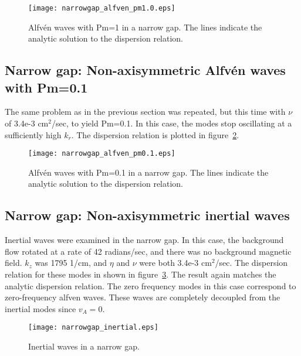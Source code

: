 \documentclass[letterpaper]{article}
\begin{document}
\begin{figure}
\begin{center}
\texttt{[image: narrowgap\_alfven\_pm1.0.eps]}
\caption{Alfv\'en waves with Pm=1 in a narrow gap.  The lines indicate
  the analytic solution to the dispersion relation.}
\label{fig:narrowgapalfven}
\end{center}
\end{figure}

\subsection{Narrow gap: Non-axisymmetric Alfv\'en waves with Pm=0.1}

The same problem as in the previous section was repeated, but this
time with $\nu$ of 3.4e-3 cm$^2$/sec, to yield Pm=0.1.  In this case,
the modes stop oscillating at a sufficiently high $k_r$.  The
dispersion relation is plotted in
figure~\ref{fig:narrowgapalfvenpm0.1}.

\begin{figure}
\begin{center}
\texttt{[image: narrowgap\_alfven\_pm0.1.eps]}
\caption{Alfv\'en waves with Pm=0.1 in a narrow gap.  The lines
  indicate the analytic solution to the dispersion relation.}
\label{fig:narrowgapalfvenpm0.1}
\end{center}
\end{figure}

\subsection{Narrow gap: Non-axisymmetric inertial waves}
Inertial waves were examined in the narrow gap.  In this case, the
background flow rotated at a rate of 42 radians/sec, and there was no
background magnetic field.  $k_z$ was 1795 1/cm, and $\eta$ and $\nu$
were both 3.4e-3 cm$^2$/sec.  The dispersion relation for these modes
in shown in figure~\ref{fig:narrowgapinertial}.  The result again
matches the analytic dispersion relation.  The zero frequency modes in
this case correspond to zero-frequency alfven waves.  These waves are
completely decoupled from the inertial modes since $v_{A}=0$.

\begin{figure}
\begin{center}
\texttt{[image: narrowgap\_inertial.eps]}
\caption{Inertial waves in a narrow gap.}
\label{fig:narrowgapinertial}
\end{center}
\end{figure}
\end{document}
